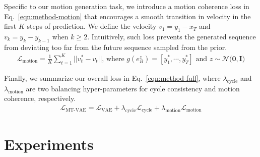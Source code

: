 \documentclass[runningheads]{llncs}
\newcommand{\cutsectionup}{\vspace*{-0.2in}}
\newcommand{\cutsectiondown}{\vspace*{-0.12in}}
\begin{document}
Specific to our motion generation task, we introduce a motion coherence loss in Eq.~\ref{eqn:method-motion} that encourages a smooth transition in velocity in the first $K$ steps of prediction. 
We define the velocity $v_1 = y_1 - x_T$ and $v_k = y_k - y_{k-1}$ when $k \geq 2$.
Intuitively, such loss prevents the generated sequence from deviating too far from the future sequence sampled from the prior.
\vspace*{-0.1in}
\begin{align}
\mathcal{L}_\text{motion} = \frac{1}{K}\sum_{t=1}^K ||v^*_t - v_t||\text{, where $g(e^z_B) = [y^*_1, \cdots, y^*_T]$ and $z \sim \mathcal{N}(\mathbf{0}, \mathbf{I}$)}\label{eqn:method-motion}
\end{align}

Finally, we summarize our overall loss in Eq.~\ref{eqn:method-full}, where $\lambda_\text{cycle}$ and $\lambda_\text{motion}$ are two balancing hyper-parameters for cycle consistency and motion coherence, respectively.
\begin{align}
\mathcal{L}_\text{MT-VAE} = \mathcal{L}_\text{VAE} + \lambda_\text{cycle}  \mathcal{L}_\text{cycle} + \lambda_\text{motion} \mathcal{L}_\text{motion}
\label{eqn:method-full}
\end{align}

\cutsectionup
\section{Experiments}
\cutsectiondown
\end{document}
